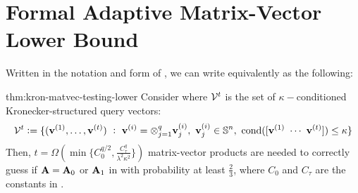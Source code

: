 

\section{Formal Adaptive Matrix-Vector Lower Bound}
\label{app:formal-kronmatvec-lower}


Written in the notation and form of , we can write  equivalently as the following:
\begin{reptheorem}{thm:kron-matvec-testing-lower}
Consider  where \({\mathcal V}^t\) is the set of \(\kappa-\)conditioned Kronecker-structured query vectors:
\[
    {\mathcal V}^t \;{\vcentcolon=}\;
    \{
        (\boldsymbol{\mathrm{v}}^{(1)},\ldots,\boldsymbol{\mathrm{v}}^{(t)})
        ~:~
        \boldsymbol{\mathrm{v}}^{(i)} = \otimes_{j=1}^q \boldsymbol{\mathrm{v}}^{(i)}_j
        ,~
        \boldsymbol{\mathrm{v}}^{(i)}_j\in{\mathbb S}^{n}
        ,~
        \text{cond}([\boldsymbol{\mathrm{v}}^{(1)} ~ \cdots ~ \boldsymbol{\mathrm{v}}^{(t)}]) \leq \kappa
    \}
\]
Then, \(t = \Omega(\min\{C_0^{q/2}, \frac{C_\tau^q}{\lambda^2 \kappa^2}\})\) matrix-vector products are needed to correctly guess if \(\mathbf{A} = \mathbf{A}_0\) or \(\mathbf{A}_1\) in  with probability at least \(\frac23\), where \(C_0\) and \(C_\tau\) are the constants in .
\end{reptheorem}
